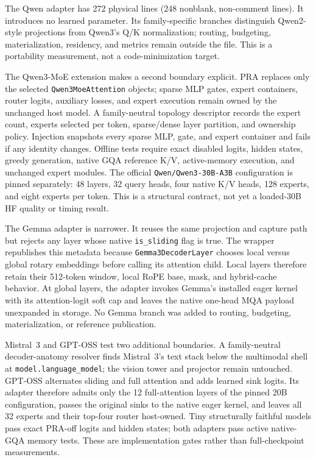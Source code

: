 \documentclass[11pt]{article}
\begin{document}
The Qwen adapter has 272 physical lines (248 nonblank, non-comment lines). It introduces
no learned parameter. Its family-specific branches distinguish Qwen2-style projections from
Qwen3's Q/K normalization; routing, budgeting, materialization, residency, and metrics remain
outside the file. This is a portability measurement, not a code-minimization target.

The Qwen3-MoE extension makes a second boundary explicit. PRA replaces only
the selected \texttt{Qwen3MoeAttention} objects; sparse MLP gates, expert
containers, router logits, auxiliary losses, and expert execution remain owned
by the unchanged host model. A family-neutral topology descriptor records the
expert count, experts selected per token, sparse/dense layer partition, and
ownership policy. Injection snapshots every sparse MLP, gate, and expert
container and fails if any identity changes. Offline tests require exact
disabled logits, hidden states, greedy generation, native GQA reference K/V,
active-memory execution, and unchanged expert modules. The official
\texttt{Qwen/Qwen3-30B-A3B} configuration is pinned separately: 48 layers, 32
query heads, four native K/V heads, 128 experts, and eight experts per token.
This is a structural contract, not yet a loaded-30B HF quality or timing result.

The Gemma adapter is narrower. It reuses the same projection and capture path but rejects any
layer whose native \texttt{is\_sliding} flag is true. The wrapper republishes this metadata because
\texttt{Gemma3DecoderLayer} chooses local versus global rotary embeddings before calling its
attention child. Local layers therefore retain their 512-token window, local RoPE base, mask,
and hybrid-cache behavior. At global layers, the adapter invokes Gemma's installed eager kernel
with its attention-logit soft cap and leaves the native one-head MQA payload unexpanded in storage.
No Gemma branch was added to routing, budgeting, materialization, or reference publication.

Mistral~3 and GPT-OSS test two additional boundaries. A family-neutral decoder-anatomy resolver
finds Mistral~3's text stack below the multimodal shell at
\texttt{model.language\_model}; the vision tower and projector remain untouched. GPT-OSS
alternates sliding and full attention and adds learned sink logits. Its adapter therefore admits
only the 12 full-attention layers of the pinned 20B configuration, passes the original sinks to
the native eager kernel, and leaves all 32 experts and their top-four router host-owned. Tiny
structurally faithful models pass exact PRA-off logits and hidden states; both adapters pass active
native-GQA memory tests. These are implementation gates rather than full-checkpoint measurements.
\end{document}
